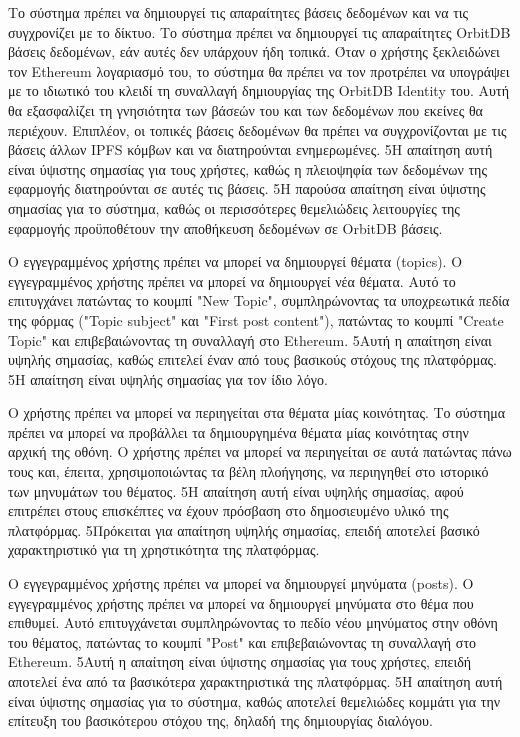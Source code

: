 \begin{enumerate}[label=\textbf{<ΛΑ-\arabic*>}, leftmargin=\parindent, align=left, labelwidth=\parindent, labelsep=0pt]
	\sysReqItem
		{\label{srs:functional-srs-create-user-databases}}
		{Το σύστημα πρέπει να δημιουργεί τις απαραίτητες βάσεις δεδομένων και να τις συγχρονίζει με το δίκτυο.}
		{Το σύστημα πρέπει να δημιουργεί τις απαραίτητες OrbitDB βάσεις δεδομένων, εάν αυτές δεν υπάρχουν ήδη τοπικά. Όταν ο χρήστης ξεκλειδώνει τον Ethereum λογαριασμό του, το σύστημα θα πρέπει να τον προτρέπει να υπογράψει με το ιδιωτικό του κλειδί τη συναλλαγή δημιουργίας της OrbitDB Identity του. Αυτή θα εξασφαλίζει τη γνησιότητα των βάσεών του και των δεδομένων που εκείνες θα περιέχουν. Επιπλέον, οι τοπικές βάσεις δεδομένων θα πρέπει να συγχρονίζονται με τις βάσεις άλλων IPFS κόμβων και να διατηρούνται ενημερωμένες.}
		{5}{Η απαίτηση αυτή είναι ύψιστης σημασίας για τους χρήστες, καθώς η πλειοψηφία των δεδομένων της εφαρμογής διατηρούνται σε αυτές τις βάσεις.}
		{5}{Η παρούσα απαίτηση είναι ύψιστης σημασίας για το σύστημα, καθώς οι περισσότερες θεμελιώδεις λειτουργίες της εφαρμογής προϋποθέτουν την αποθήκευση δεδομένων σε OrbitDB βάσεις.}

	\sysReqItem
		{\label{srs:functional-srs-create-topic}}
		{Ο εγγεγραμμένος χρήστης πρέπει να μπορεί να δημιουργεί θέματα (topics).}
		{Ο εγγεγραμμένος χρήστης πρέπει να μπορεί να δημιουργεί νέα θέματα. Αυτό το επιτυγχάνει πατώντας το κουμπί "New Topic", συμπληρώνοντας τα υποχρεωτικά πεδία της φόρμας ("Topic subject" και "First post content"), πατώντας το κουμπί "Create Topic" και επιβεβαιώνοντας τη συναλλαγή στο Ethereum.}
		{5}{Αυτή η απαίτηση είναι υψηλής σημασίας, καθώς επιτελεί έναν από τους βασικούς στόχους της πλατφόρμας.}
		{5}{Η απαίτηση είναι υψηλής σημασίας για τον ίδιο λόγο.}

	\sysReqItem
		{\label{srs:functional-srs-browse-community-topics}}
		{Ο χρήστης πρέπει να μπορεί να περιηγείται στα θέματα μίας κοινότητας.}
		{Το σύστημα πρέπει να μπορεί να προβάλλει τα δημιουργημένα θέματα μίας κοινότητας στην αρχική της οθόνη. Ο χρήστης πρέπει να μπορεί να περιηγείται σε αυτά πατώντας πάνω τους και, έπειτα, χρησιμοποιώντας τα βέλη πλοήγησης, να περιηγηθεί στο ιστορικό των μηνυμάτων του θέματος.}
		{5}{Η απαίτηση αυτή είναι υψηλής σημασίας, αφού επιτρέπει στους επισκέπτες να έχουν πρόσβαση στο δημοσιευμένο υλικό της πλατφόρμας.}
		{5}{Πρόκειται για απαίτηση υψηλής σημασίας, επειδή αποτελεί βασικό χαρακτηριστικό για τη χρηστικότητα της πλατφόρμας.}

	\sysReqItem
		{\label{srs:functional-srs-create-post}}
		{Ο εγγεγραμμένος χρήστης πρέπει να μπορεί να δημιουργεί μηνύματα (posts).}
		{Ο εγγεγραμμένος χρήστης πρέπει να μπορεί να δημιουργεί μηνύματα στο θέμα που επιθυμεί. Αυτό επιτυγχάνεται συμπληρώνοντας το πεδίο νέου μηνύματος στην οθόνη του θέματος, πατώντας το κουμπί "Post" και επιβεβαιώνοντας τη συναλλαγή στο Ethereum.}
		{5}{Αυτή η απαίτηση είναι ύψιστης σημασίας για τους χρήστες, επειδή αποτελεί ένα από τα βασικότερα χαρακτηριστικά της πλατφόρμας.}
		{5}{Η απαίτηση αυτή είναι ύψιστης σημασίας για το σύστημα, καθώς αποτελεί θεμελιώδες κομμάτι για την επίτευξη του βασικότερου στόχου της, δηλαδή της δημιουργίας διαλόγου.}


\end{enumerate}
